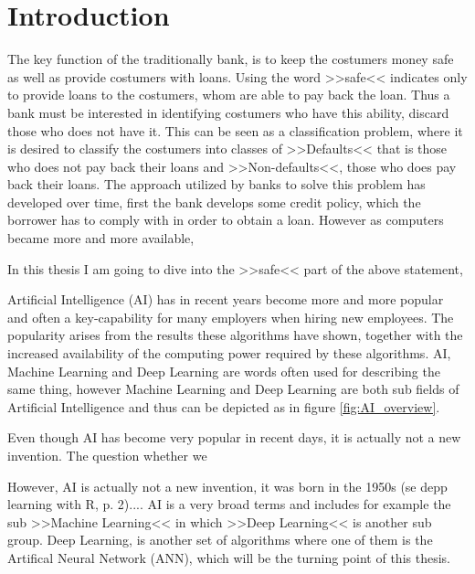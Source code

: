 \chapter{Introduction}\label{ch:1}
The key function of the traditionally bank, is to keep the costumers money safe as well as provide costumers with loans. Using the word >>safe<< indicates only to provide loans to the costumers, whom are able to pay back the loan. Thus a bank must be interested in identifying costumers who have this ability, discard those who does not have it. This can be seen as a classification problem, where it is desired to classify the costumers into classes of >>Defaults<< that is those who does not pay back their loans and >>Non-defaults<<, those who does pay back their loans. The approach utilized by banks to solve this problem has developed over time, first the bank develops some credit policy, which the borrower has to comply with in order to obtain a loan. However as computers became more and more available,  


In this thesis I am going to dive into the >>safe<< part of the above statement,  












Artificial Intelligence (AI) has in recent years become more and more popular and often a key-capability for many employers when hiring new employees. The popularity arises from the results these algorithms have shown, together with the increased availability of the computing power required by these algorithms. AI, Machine Learning and Deep Learning are words often used for describing the same thing, however Machine Learning and Deep Learning are both sub fields of Artificial Intelligence and thus can be depicted as in figure \ref{fig:AI_overview}. 

Even though AI has become very popular in recent days, it is actually not a new invention. The question whether we 

However, AI is actually not a new invention, it was born in the 1950s (se depp learning with R, p. 2).... 
AI is a very broad terms and includes for example the sub >>Machine Learning<< in which >>Deep Learning<< is another sub group. Deep Learning, is another set of algorithms where one of them is the Artifical Neural Network (ANN), which will be the turning point of this thesis. 


